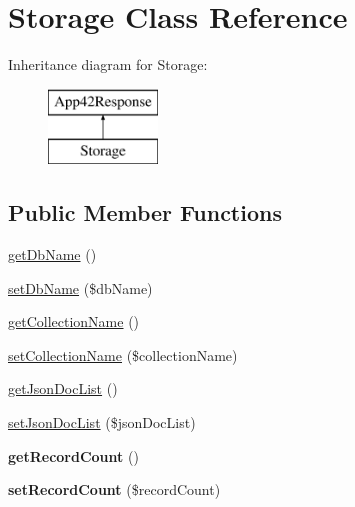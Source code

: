 \hypertarget{class_storage}{\section{Storage Class Reference}
\label{class_storage}
}
Inheritance diagram for Storage\+:\begin{figure}[H]
\begin{center}
\leavevmode
\includegraphics[height=2.000000cm]{class_storage}
\end{center}
\end{figure}
\subsection*{Public Member Functions}
\begin{DoxyCompactItemize}
\item 
\hyperlink{class_storage_a4949c3e4d80c0d275c80e0c1c3b5b280}{get\+Db\+Name} ()
\item 
\hyperlink{class_storage_a55e274fa64c9f7618333cb9e9d4bc1ed}{set\+Db\+Name} (\$db\+Name)
\item 
\hyperlink{class_storage_adc1c8c1be2025b9b2aa1795c902b9b55}{get\+Collection\+Name} ()
\item 
\hyperlink{class_storage_a93f30d41eaac30ca2bf538f09d466f31}{set\+Collection\+Name} (\$collection\+Name)
\item 
\hyperlink{class_storage_a6900743273016ed1df50e4bd583e504d}{get\+Json\+Doc\+List} ()
\item 
\hyperlink{class_storage_ae178908f40250667f1b8ad5336e3e57f}{set\+Json\+Doc\+List} (\$json\+Doc\+List)
\item 
\hypertarget{class_storage_a4f27c312baf244b90e1ba0200e3719e3}{{\bfseries get\+Record\+Count} ()}\label{class_storage_a4f27c312baf244b90e1ba0200e3719e3}

\item 
\hypertarget{class_storage_adaf5bd20d0cd4bc9a871b935d25bcb0a}{{\bfseries set\+Record\+Count} (\$record\+Count)}\label{class_storage_adaf5bd20d0cd4bc9a871b935d25bcb0a}

\end{DoxyCompactItemize}
